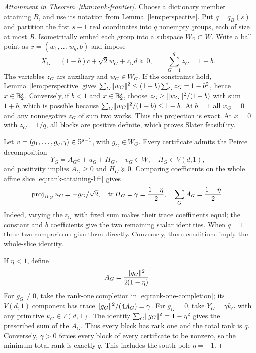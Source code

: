 \begin{proof}[Attainment in Theorem~\ref{thm:rank-frontier}]
Choose a dictionary member attaining $B$, and use its notation from
Lemma~\ref{lem:perspective}. Put $q=q_B(s)$ and partition the first
$s-1$ real coordinates into $q$ nonempty groups, each of size at most $B$.
Isometrically embed each group into a subspace $W_G\subset W$.
Write a ball point as $x=(w_1,\ldots,w_q,b)$ and impose
\begin{equation}\label{eq:rank-attaining-lift}
 X_G=(1-b)c+\sqrt2 w_G+z_Gd\succeq0,
 \qquad \sum_{G=1}^q z_G=1+b.
\end{equation}
The variables $z_G$ are auxiliary and $w_G\in W_G$.
If the constraints hold, Lemma~\ref{lem:perspective} gives
$\sum_G\lVert w_G\rVert^2\leq(1-b)\sum_Gz_G=1-b^2$, hence $x\in\mathbb B_2^s$.
Conversely, if $b<1$ and $x\in\mathbb B_2^s$, choose
$z_G\geq\lVert w_G\rVert^2/(1-b)$ with sum $1+b$, which is possible because
$\sum_G\lVert w_G\rVert^2/(1-b)\leq1+b$. At $b=1$ all $w_G=0$ and any
nonnegative $z_G$ of sum two works. Thus the projection is exact. At $x=0$ with $z_G=1/q$, all blocks
are positive definite, which proves Slater feasibility.

Let $v=(g_1,\ldots,g_q,\eta)\in\mathbb S^{s-1}$, with $g_G\in W_G$.
Every certificate admits the Peirce decomposition
\[
 Y_G=A_Gc+u_G+H_G,\quad u_G\in W,\quad H_G\in V(d,1),
\]
and positivity implies $A_G\geq0$ and $H_G\succeq0$.
Comparing coefficients on the whole affine slice
\eqref{eq:rank-attaining-lift} gives
\begin{equation}\label{eq:certificate-coefficients}
 \operatorname{proj}_{W_G}u_G=-g_G/\sqrt2,\quad
 \operatorname{tr} H_G=\gamma=\frac{1-\eta}{2},\quad
 \sum_G A_G=\frac{1+\eta}{2}.
\end{equation}
Indeed, varying the $z_G$ with fixed sum makes their trace coefficients
equal; the constant and $b$ coefficients give the two remaining scalar
identities. When $q=1$ these two comparisons give them directly.
Conversely, these conditions imply the whole-slice identity.

If $\eta<1$, define
\[
 A_G=\frac{\lVert g_G\rVert^2}{2(1-\eta)}.
\]
For $g_G\ne0$, take the rank-one completion in
\eqref{eq:rank-one-completion}; its $V(d,1)$ component has trace
$\lVert g_G\rVert^2/(4A_G)=\gamma$. For $g_G=0$, take
$Y_G=\gamma k_G$ with any primitive $k_G\in V(d,1)$.
The identity $\sum_G\lVert g_G\rVert^2=1-\eta^2$ gives the prescribed sum of
the $A_G$. Thus every block has rank one and the total rank is $q$.
Conversely, $\gamma>0$ forces every block of every certificate to be
nonzero, so the minimum total rank is exactly $q$.
This includes the south pole $\eta=-1$.


\end{proof}

